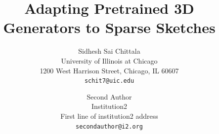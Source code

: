 \documentclass[10pt,twocolumn,letterpaper]{article}
\title{Adapting Pretrained 3D Generators to Sparse Sketches}
\author{Sidhesh Sai Chittala\\
University of Illinois at Chicago\\
1200 West Harrison Street, Chicago, IL 60607\\
{\tt\small schit7@uic.edu}
\and
Second Author\\
Institution2\\
First line of institution2 address\\
{\tt\small secondauthor@i2.org}
}
\begin{document}
\maketitle
    





{
    \small
    
    
}
\end{document}
